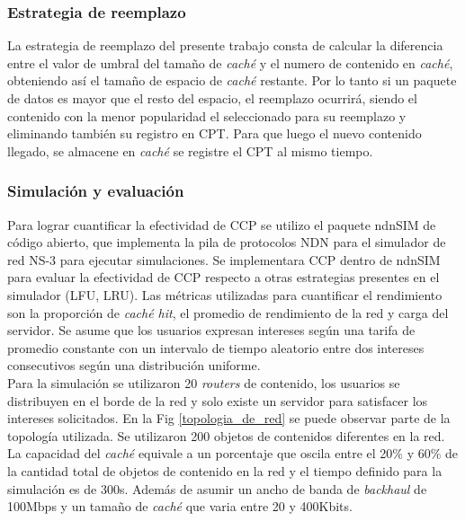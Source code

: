 \documentclass[12pt]{ociamthesis}  %
\begin{document}
\pagebreak

\subsubsection{Estrategia de reemplazo}

La estrategia de reemplazo del presente trabajo consta de calcular la diferencia entre el valor de umbral del tamaño de \textit{caché} y el numero de contenido en \textit{caché}, obteniendo así el tamaño de espacio de \textit{caché} restante. Por lo tanto si un paquete de datos es mayor que el resto del espacio, el reemplazo ocurrirá, siendo el contenido con la menor popularidad el seleccionado para su reemplazo y eliminando también su registro en CPT. Para que luego el nuevo contenido llegado, se almacene en \textit{caché} se registre el CPT al mismo tiempo.\\

\subsubsection{Simulación y evaluación}
Para lograr cuantificar la efectividad de CCP se utilizo el paquete ndnSIM de código abierto, que implementa la pila de protocolos NDN para el simulador de red NS-3 para ejecutar simulaciones. Se implementara CCP dentro de ndnSIM para evaluar la efectividad de CCP respecto a otras estrategias presentes en el simulador (LFU, LRU). Las métricas utilizadas para cuantificar el rendimiento son la proporción de \textit{caché hit}, el promedio de rendimiento de la red y carga del servidor. Se asume que los usuarios expresan intereses según una tarifa de promedio constante con un intervalo de tiempo aleatorio entre dos intereses consecutivos según una distribución uniforme.\\

Para la simulación se utilizaron 20 \textit{routers} de contenido, los usuarios se distribuyen en el borde de la red y solo existe un servidor para satisfacer los intereses solicitados. En la Fig \ref{topologia_de_red} se puede observar parte de la topología utilizada. Se utilizaron 200 objetos de contenidos diferentes en la red. La capacidad del \textit{caché} equivale a un porcentaje que oscila entre el 20\% y 60\% de la cantidad total de objetos de contenido en la red y el tiempo definido para la simulación es de 300s. Además de asumir un ancho de banda de \textit{backhaul} de 100Mbps y un tamaño de \textit{caché} que varia entre 20 y 400Kbits.\\
\end{document}
